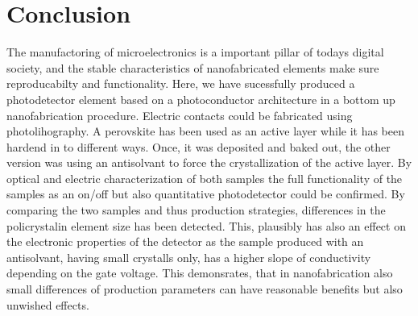 
\section{Conclusion}
\label{sec:Conclusion}

The manufactoring of microelectronics is a important pillar of todays digital society, and the stable characteristics of nanofabricated elements make sure reproducabilty and functionality.
Here, we have sucessfully produced a photodetector element based on a photoconductor architecture in a bottom up nanofabrication procedure.
Electric contacts could be fabricated using photolihography.
A perovskite has been used as an active layer while it has been hardend in to different ways. 
Once, it was deposited and baked out, the other version was using an antisolvant to force the crystallization of the active layer.
By optical and electric characterization of both samples the full functionality of the samples as an on/off but also quantitative photodetector could be confirmed.
By comparing the two samples and thus production strategies, differences in the policrystalin element size has been detected.
This, plausibly has also an effect on the electronic properties of the detector as the sample produced with an antisolvant, having small crystalls only, has a higher slope of conductivity depending on the gate voltage.
This demonsrates, that in nanofabrication also small differences of production parameters can have reasonable benefits but also unwished effects.



